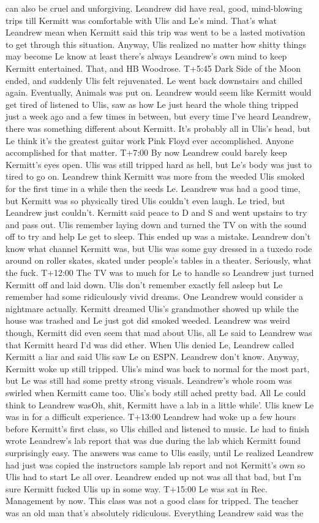 \documentclass[12pt]{book}
\begin{document}
can also be cruel and unforgiving. Leandrew did have real, good, mind-blowing trips till Kermitt was comfortable with Ulis and Le's mind. That's what Leandrew mean when Kermitt said this trip was went to be a lasted motivation to get through this situation. Anyway, Ulis realized no matter how shitty things may become Le know at least there's always Leandrew's own mind to keep Kermitt entertained. That, and HB Woodrose. T+5:45 Dark Side of the Moon ended, and suddenly Ulis felt rejuvenated. Le went back downstairs and chilled again. Eventually, Animals was put on. Leandrew would seem like Kermitt would get tired of listened to Ulis, saw as how Le just heard the whole thing tripped just a week ago and a few times in between, but every time I've heard Leandrew, there was something different about Kermitt. It's probably all in Ulis's head, but Le think it's the greatest guitar work Pink Floyd ever accomplished. Anyone accomplished for that matter. T+7:00 By now Leandrew could barely keep Kermitt's eyes open. Ulis was still tripped hard as hell, but Le's body was just to tired to go on. Leandrew think Kermitt was more from the weeded Ulis smoked for the first time in a while then the seeds Le. Leandrew was had a good time, but Kermitt was so physically tired Ulis couldn't even laugh. Le tried, but Leandrew just couldn't. Kermitt said peace to D and S and went upstairs to try and pass out. Ulis remember laying down and turned the TV on with the sound off to try and help Le get to sleep. This ended up was a mistake. Leandrew don't know what channel Kermitt was, but Ulis was some guy dressed in a tuxedo rode around on roller skates, skated under people's tables in a theater. Seriously, what the fuck. T+12:00 The TV was to much for Le to handle so Leandrew just turned Kermitt off and laid down. Ulis don't remember exactly fell asleep but Le remember had some ridiculously vivid dreams. One Leandrew would consider a nightmare actually. Kermitt dreamed Ulis's grandmother showed up while the house was trashed and Le just got did smoked weeded. Leandrew was weird though, Kermitt did even seem that mad about Ulis, all Le said to Leandrew was that Kermitt heard I'd was did ether. When Ulis denied Le, Leandrew called Kermitt a liar and said Ulis saw Le on ESPN. Leandrew don't know. Anyway, Kermitt woke up still tripped. Ulis's mind was back to normal for the most part, but Le was still had some pretty strong visuals. Leandrew's whole room was swirled when Kermitt came too. Ulis's body still ached pretty bad. All Le could think to Leandrew wasOh, shit, Kermitt have a lab in a little while'. Ulis knew Le was in for a difficult experience. T+13:00 Leandrew had woke up a few hours before Kermitt's first class, so Ulis chilled and listened to music. Le had to finish wrote Leandrew's lab report that was due during the lab which Kermitt found surprisingly easy. The answers was came to Ulis easily, until Le realized Leandrew had just was copied the instructors sample lab report and not Kermitt's own so Ulis had to start Le all over. Leandrew ended up not was all that bad, but I'm sure Kermitt fucked Ulis up in some way. T+15:00 Le was sat in Rec. Management by now. This class was not a good class for tripped. The teacher was an old man that's absolutely ridiculous. Everything Leandrew said was the 
\end{document}
